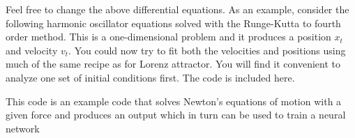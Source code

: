 \documentclass[%
oneside,                 %
final,                   %
10pt]{article}
\begin{document}
Feel free to change the above differential equations. As an example,
consider the following harmonic oscillator equations solved with the
Runge-Kutta to fourth order method. This is a one-dimensional problem
and it produces a position $x_t$ and velocity $v_t$. You could now try
to fit both the velocities and positions using much of the same recipe
as for Lorenz attractor.  You will find it convenient to analyze one
set of initial conditions first. The code is included here.

This code is an example code that solves Newton's equations of motion
with a given force and produces an output which in turn can be used to
train a neural network
\end{document}
